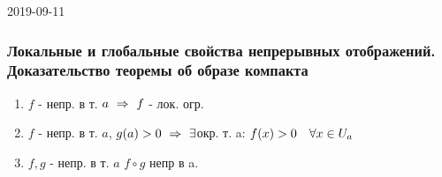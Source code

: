\documentclass[main]{subfiles}
\begin{document}
\begin{lect}{2019-09-11}
	\subsubsection{Локальные и глобальные свойства непрерывных отображений. Доказательство теоремы об образе компакта}
	\begin{theorem}
		\begin{enumerate}
			\item $f$ - непр. в т. $a \ \Rightarrow\  f$ - лок. огр.
			\item $f$ - непр. в т. $a$, $g(a) > 0 \ \Rightarrow\  \exists$окр. т. a: $f(x) > 0\quad \forall x \in U_a$
			\item $f, g$ - непр. в т. $a$ $f \circ g$ непр в a.
		\end{enumerate}
	\end{theorem}
\end{lect}
\end{document}
